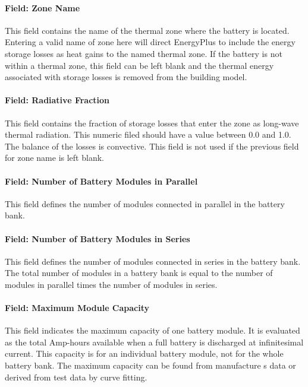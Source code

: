 \paragraph{Field: Zone Name}\label{field-zone-name-6-000}

This field contains the name of the thermal zone where the battery is located. Entering a valid name of zone here will direct EnergyPlus to include the energy storage losses as heat gains to the named thermal zone. If the battery is not within a thermal zone, this field can be left blank and the thermal energy associated with storage losses is removed from the building model.

\paragraph{Field: Radiative Fraction}\label{field-radiative-fraction-4}

This field contains the fraction of storage losses that enter the zone as long-wave thermal radiation. This numeric filed should have a value between 0.0 and 1.0. The balance of the losses is convective. This field is not used if the previous field for zone name is left blank.

\paragraph{Field: Number of Battery Modules in Parallel}\label{field-number-of-battery-modules-in-parallel}

This field defines the number of modules connected in parallel in the battery bank.

\paragraph{Field: Number of Battery Modules in Series}\label{field-number-of-battery-modules-in-series}

This field defines the number of modules connected in series in the battery bank. The total number of modules in a battery bank is equal to the number of modules in parallel times the number of modules in series.

\paragraph{Field: Maximum Module Capacity}\label{field-maximum-module-capacity}

This field indicates the maximum capacity of one battery module. It is evaluated as the total Amp-hours available when a full battery is discharged at infinitesimal current. This capacity is for an individual battery module, not for the whole battery bank. The maximum capacity can be found from manufacture s data or derived from test data by curve fitting.

